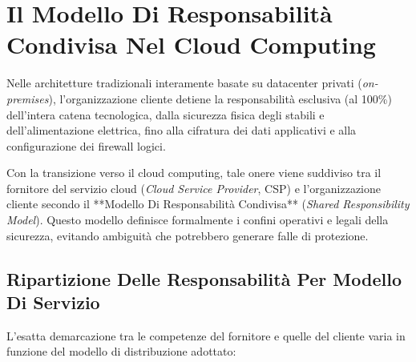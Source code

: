 \documentclass[11pt, a4paper]{article}
\begin{document}
\newpage

\section{Il Modello Di Responsabilità Condivisa Nel Cloud Computing}

Nelle architetture tradizionali interamente basate su datacenter privati (\emph{on-premises}), l'organizzazione cliente detiene la responsabilità esclusiva (al 100\%) dell'intera catena tecnologica, dalla sicurezza fisica degli stabili e dell'alimentazione elettrica, fino alla cifratura dei dati applicativi e alla configurazione dei firewall logici.

Con la transizione verso il cloud computing, tale onere viene suddiviso tra il fornitore del servizio cloud (\emph{Cloud Service Provider}, CSP) e l'organizzazione cliente secondo il **Modello Di Responsabilità Condivisa** (\emph{Shared Responsibility Model}). Questo modello definisce formalmente i confini operativi e legali della sicurezza, evitando ambiguità che potrebbero generare falle di protezione.


\subsection{Ripartizione Delle Responsabilità Per Modello Di Servizio}

L'esatta demarcazione tra le competenze del fornitore e quelle del cliente varia in funzione del modello di distribuzione adottato:
\end{document}
